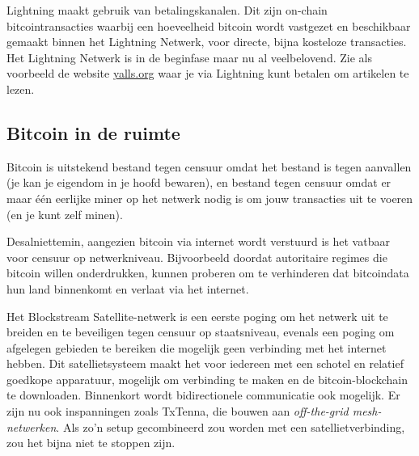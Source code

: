 Lightning maakt gebruik van betalingskanalen. Dit zijn on-chain bitcointransacties waarbij een hoeveelheid bitcoin wordt vastgezet en beschikbaar gemaakt binnen het Lightning Netwerk, voor directe, bijna kosteloze transacties. Het Lightning Netwerk is in de beginfase maar nu al veelbelovend. Zie als voorbeeld de website \href{https://yalls.org}{yalls.org} waar je via Lightning kunt betalen om artikelen te lezen.  

\subsection{Bitcoin in de ruimte}

Bitcoin is uitstekend bestand tegen censuur omdat het bestand is tegen aanvallen (je kan je eigendom in je hoofd bewaren), en bestand tegen censuur omdat er maar één eerlijke miner op het netwerk nodig is om jouw transacties uit te voeren (en je kunt zelf minen). 

Desalniettemin, aangezien bitcoin via internet wordt verstuurd is het vatbaar voor censuur op netwerkniveau. Bijvoorbeeld doordat autoritaire regimes die bitcoin willen onderdrukken, kunnen proberen om te verhinderen dat bitcoindata hun land binnenkomt en verlaat via het internet.

Het Blockstream Satellite-netwerk is een eerste poging om het netwerk uit te breiden en te beveiligen tegen censuur op staatsniveau, evenals een poging om afgelegen gebieden te bereiken die mogelijk geen verbinding met het internet hebben. Dit satellietsysteem maakt het voor iedereen met een schotel en relatief goedkope apparatuur, mogelijk om verbinding te maken en de bitcoin-blockchain te downloaden. Binnenkort wordt bidirectionele communicatie ook mogelijk. Er zijn nu ook inspanningen zoals TxTenna, die bouwen aan \textit{off-the-grid mesh-netwerken}. Als zo'n setup gecombineerd zou worden met een satellietverbinding, zou het bijna niet te stoppen zijn.

\backmatter
